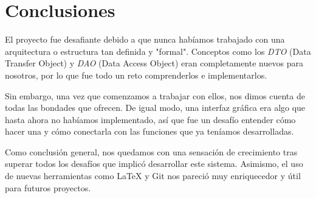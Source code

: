 \section*{Conclusiones}

El proyecto fue desafiante debido a que nunca habíamos trabajado con una arquitectura o estructura tan definida y "formal". Conceptos como los \textit{DTO} (Data Transfer Object) y \textit{DAO} (Data Access Object) eran completamente nuevos para nosotros, por lo que fue todo un reto comprenderlos e implementarlos.

Sin embargo, una vez que comenzamos a trabajar con ellos, nos dimos cuenta de todas las bondades que ofrecen. De igual modo, una interfaz gráfica era algo que hasta ahora no habíamos implementado, así que fue un desafío entender cómo hacer una y cómo conectarla con las funciones que ya teníamos desarrolladas.

Como conclusión general, nos quedamos con una sensación de crecimiento tras superar todos los desafíos que implicó desarrollar este sistema. Asimismo, el uso de nuevas herramientas como \LaTeX{} y Git nos pareció muy enriquecedor y útil para futuros proyectos.
